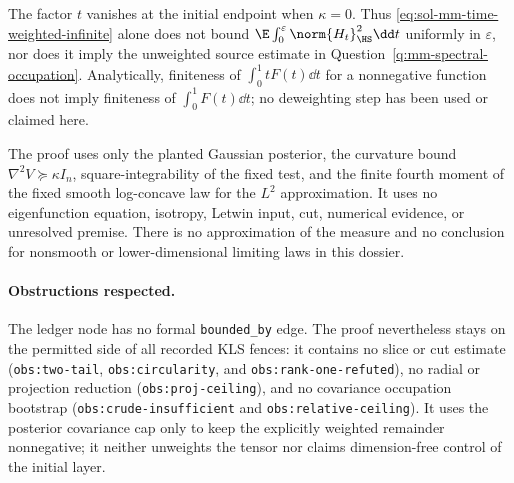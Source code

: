 \documentclass[../main.tex]{subfiles}
\begin{document}
\begin{remark}
The factor $t$ vanishes at the initial endpoint when $\kappa=0$.  Thus
\eqref{eq:sol-mm-time-weighted-infinite} alone does not bound
$\E\int_0^\varepsilon\norm{H_t}_{\HS}^2\dd t$ uniformly in $\varepsilon$, nor does it imply
the unweighted source estimate in Question~\ref{q:mm-spectral-occupation}.  Analytically,
finiteness of $\int_0^1tF(t)\dd t$ for a nonnegative function does not imply finiteness of
$\int_0^1F(t)\dd t$; no deweighting step has been used or claimed here.
\end{remark}

\begin{remark}
The proof uses only the planted Gaussian posterior, the curvature bound
$\nabla^2V\succeq\kappa I_n$, square-integrability of the fixed test, and the finite fourth
moment of the fixed smooth log-concave law for the $L^2$ approximation.  It uses no eigenfunction
equation, isotropy, Letwin input, cut, numerical evidence, or unresolved premise.  There is no
approximation of the measure and no conclusion for nonsmooth or lower-dimensional limiting
laws in this dossier.
\end{remark}

\paragraph{Obstructions respected.}
The ledger node has no formal \texttt{bounded\_by} edge.  The proof nevertheless stays on the
permitted side of all recorded KLS fences: it contains no slice or cut estimate
(\texttt{obs:two-tail}, \texttt{obs:circularity}, and \texttt{obs:rank-one-refuted}), no radial
or projection reduction (\texttt{obs:proj-ceiling}), and no covariance occupation bootstrap
(\texttt{obs:crude-insufficient} and \texttt{obs:relative-ceiling}).  It uses the posterior
covariance cap only to keep the explicitly weighted remainder nonnegative; it neither unweights
the tensor nor claims dimension-free control of the initial layer.
\end{document}
